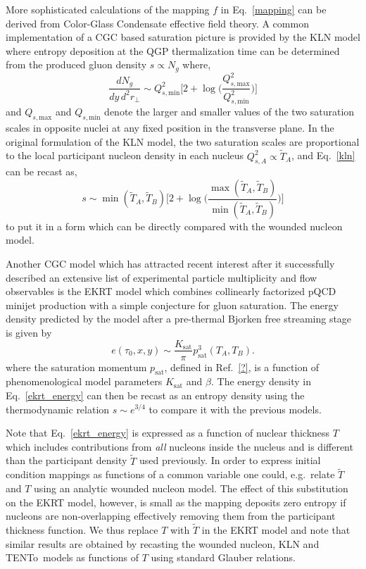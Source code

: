 \documentclass[aps,prc,reprint,amsmath,nofootinbib]{revtex4-1}
\newcommand{\trento}{T\raisebox{-0.5ex}{R}ENTo}
\newcommand{\T}{\tilde{T}}
\newcommand{\Qs}[1]{Q_{s,\text{#1}}}
\begin{document}
More sophisticated calculations of the mapping $f$ in Eq.~\eqref{mapping} can be derived from Color-Glass Condensate effective field theory. A common implementation of a CGC based saturation picture is provided by the KLN model where entropy deposition at the QGP thermalization time can be determined from the produced gluon density $s \propto N_g$ where,
\begin{equation}
    \label{kln}
    \frac{dN_g}{dy\,d^2r_\perp} \sim \Qs{min}^2 \biggl[ 2 + \log \biggr(\frac{\Qs{max}^2}{\Qs{min}^2} \biggr) \biggr]
\end{equation}
and $\Qs{max}$ and $\Qs{min}$ denote the larger and smaller values of the two saturation scales in opposite nuclei at any fixed position in the transverse plane.
In the original formulation of the KLN model, the two saturation scales are proportional to the local participant nucleon density in each nucleus $Q^2_{s,A} \propto \T_A$, and Eq.~\eqref{kln} can be recast as,
\begin{equation}
    s \sim \min(\T_A, \T_B)\biggr[2 + \log \biggr(\frac{\max(\T_A,\T_B)}{\min(\T_A,\T_B)}\biggr) \biggr]
\end{equation}
to put it in a form which can be directly compared with the wounded nucleon model.

Another CGC model which has attracted recent interest after it successfully described an extensive list of experimental particle multiplicity and flow observables is the EKRT model which combines collinearly factorized pQCD minijet production with a simple conjecture for gluon saturation. The energy density predicted by the model after a pre-thermal Bjorken free streaming stage is given by
\begin{equation}
    \label{ekrt_energy}
    e(\tau_0, x, y) \sim \frac{K_\text{sat}}{\pi} p_\text{sat}^3(T_A, T_B).
\end{equation}
where the saturation momentum $p_\text{sat}$, defined in Ref.~\ref{?}, is a function of phenomenological model parameters $K_\text{sat}$ and $\beta$. The energy density in Eq.~\eqref{ekrt_energy} can then be recast as an entropy density using the thermodynamic relation ${s \sim e^{3/4}}$ to compare it with the previous models.

Note that Eq.~\eqref{ekrt_energy} is expressed as a function of nuclear thickness $T$ which includes contributions from \emph{all} nucleons inside the nucleus and is different than the participant density $\T$ used previously. In order to express initial condition mappings as functions of a common variable one could, e.g.\ relate $\T$ and $T$ using an analytic wounded nucleon model. The effect of this substitution on the EKRT model, however, is small as the mapping deposits zero entropy if nucleons are non-overlapping effectively removing them from the participant thickness function. We thus replace $T$ with $\T$ in the EKRT model and note that similar results are obtained by recasting the wounded nucleon, KLN and \trento\ models as functions of $T$ using standard Glauber relations.
\end{document}
